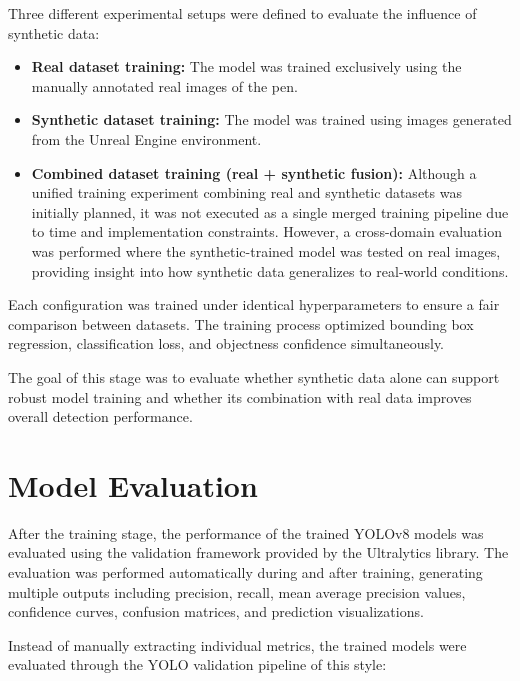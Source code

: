 \documentclass[conference,a4paper]{IEEEtran}
\begin{document}
Three different experimental setups were defined to evaluate the influence of synthetic data:

\begin{itemize}

\item \textbf{Real dataset training:} The model was trained exclusively using the manually annotated real images of the pen.

\item \textbf{Synthetic dataset training:} The model was trained using images generated from the Unreal Engine environment.

\item \textbf{Combined dataset training (real + synthetic fusion):} Although a unified training experiment combining real and synthetic datasets was initially planned, it was not executed as a single merged training pipeline due to time and implementation constraints. However, a cross-domain evaluation was performed where the synthetic-trained model was tested on real images, providing insight into how synthetic data generalizes to real-world conditions.

\end{itemize}

Each configuration was trained under identical hyperparameters to ensure a fair comparison between datasets. The training process optimized bounding box regression, classification loss, and objectness confidence simultaneously.

The goal of this stage was to evaluate whether synthetic data alone can support robust model training and whether its combination with real data improves overall detection performance.

\section{Model Evaluation}

After the training stage, the performance of the trained YOLOv8 models was evaluated using the validation framework provided by the Ultralytics library. The evaluation was performed automatically during and after training, generating multiple outputs including precision, recall, mean average precision values, confidence curves, confusion matrices, and prediction visualizations.

Instead of manually extracting individual metrics, the trained models were evaluated through the YOLO validation pipeline of this style:
\end{document}
